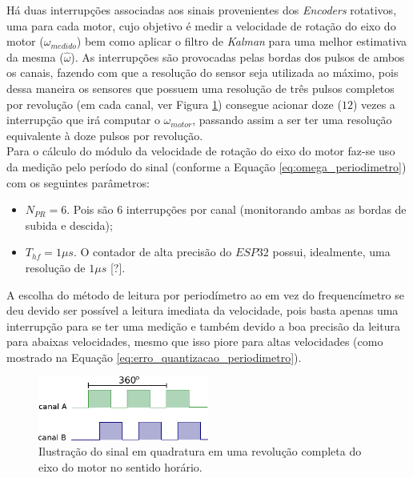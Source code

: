 Há duas interrupções associadas aos sinais provenientes dos \emph{Encoders} rotativos, uma para cada motor, cujo objetivo é medir a velocidade de rotação do eixo do motor ($\omega_{medido}$) bem como aplicar o filtro de \emph{Kalman} para uma melhor estimativa da mesma ($\hat{\omega}$). As interrupções são provocadas pelas bordas dos pulsos de ambos os canais, fazendo com que a resolução do sensor seja utilizada ao máximo, pois dessa maneira os sensores que possuem uma resolução de três pulsos completos por revolução (em cada canal, ver Figura \ref{fig:ilustracao_uma_revolucao}) consegue acionar doze ($12$) vezes a interrupção que irá computar o $\omega_{motor}$, passando assim a ser ter uma resolução equivalente à doze pulsos por revolução.\\

Para o cálculo do módulo da velocidade de rotação do eixo do motor faz-se uso da medição pelo período do sinal (conforme a Equação \ref{eq:omega_periodimetro}) com os seguintes parâmetros:

\begin{itemize}
    \item $N_{PR} = 6$. Pois são $6$ interrupções por canal (monitorando ambas as bordas de subida e descida);
    \item $T_{hf} = 1\mu{}s$. O contador de alta precisão do $ESP32$ possui, idealmente, uma resolução de $1\mu{}s$ [?].
\end{itemize}

A escolha do método de leitura por periodímetro ao em vez do frequencímetro se deu devido ser possível a leitura imediata da velocidade, pois basta apenas uma interrupção para se ter uma medição e também devido a boa precisão da leitura para abaixas velocidades, mesmo que isso piore para altas velocidades (como mostrado na Equação \ref{eq:erro_quantizacao_periodimetro}). 

\begin{figure}[H]
    \centering
    \includegraphics[width=0.5\textwidth]{imagens/ilustracoes/sinal_enquadratura_uma_revolucao.eps}
    \caption{Ilustração do sinal em quadratura em uma revolução completa do eixo do motor no sentido horário.}
    \label{fig:ilustracao_uma_revolucao}
\end{figure}


